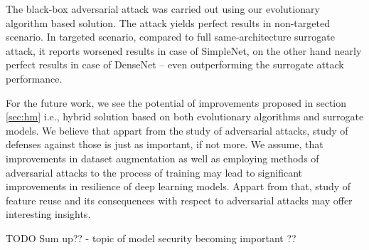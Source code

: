 The black-box adversarial attack was carried out using our evolutionary algorithm based solution. The attack yields perfect results in non-targeted scenario. In targeted scenario, compared to full same-architecture surrogate attack, it reports worsened results in case of SimpleNet, on the other hand nearly perfect results in case of DenseNet -- even outperforming the surrogate attack performance.

For the future work, we see the potential of improvements proposed in section \ref{sec:hm} i.e., hybrid solution based on both evolutionary algorithms and surrogate models. We believe that appart from the study of adversarial attacks, study of defenses against those is just as important, if not more. We assume, that improvements in dataset augmentation as well as employing methods of adversarial attacks to the process of training may lead to significant improvements in resilience of deep learning models. Appart from that, study of feature reuse and its consequences with respect to adversarial attacks may offer interesting insights.

TODO Sum up?? - topic of model security becoming important ??
